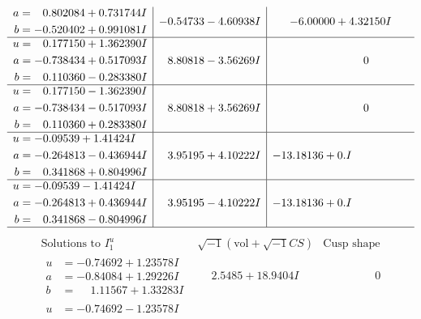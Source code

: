 \documentclass[1p]{elsarticle_modified}
\theoremstyle{definition}
\newcommand{\I}{\sqrt{-1}}
\begin{document}
$$\begin{array}{c|c|c}
\begin{aligned}
a &= \phantom{-}0.802084 + 0.731744 I \\
b &= -0.520402 + 0.991081 I\end{aligned}
 & -0.54733 - 4.60938 I & -6.00000 + 4.32150 I \\ \hline\begin{aligned}
u &= \phantom{-}0.177150 + 1.362390 I \\
a &= -0.738434 + 0.517093 I \\
b &= \phantom{-}0.110360 - 0.283380 I\end{aligned}
 & \phantom{-}8.80818 - 3.56269 I & \phantom{-0.000000 } 0 \\ \hline\begin{aligned}
u &= \phantom{-}0.177150 - 1.362390 I \\
a &= -0.738434 - 0.517093 I \\
b &= \phantom{-}0.110360 + 0.283380 I\end{aligned}
 & \phantom{-}8.80818 + 3.56269 I & \phantom{-0.000000 } 0 \\ \hline\begin{aligned}
u &= -0.09539 + 1.41424 I \\
a &= -0.264813 - 0.436944 I \\
b &= \phantom{-}0.341868 + 0.804996 I\end{aligned}
 & \phantom{-}3.95195 + 4.10222 I & -13.18136 + 0. I\phantom{ +0.000000I} \\ \hline\begin{aligned}
u &= -0.09539 - 1.41424 I \\
a &= -0.264813 + 0.436944 I \\
b &= \phantom{-}0.341868 - 0.804996 I\end{aligned}
 & \phantom{-}3.95195 - 4.10222 I & -13.18136 + 0. I\phantom{ +0.000000I}\\
 \hline 
 \end{array}$$\newpage$$\begin{array}{c|c|c}  
\text{Solutions to }I^u_{1}& \I (\text{vol} + \sqrt{-1}CS) & \text{Cusp shape}\\
 \hline 
\begin{aligned}
u &= -0.74692 + 1.23578 I \\
a &= -0.84084 + 1.29226 I \\
b &= \phantom{-}1.11567 + 1.33283 I\end{aligned}
 & \phantom{-}2.5485 + 18.9404 I & \phantom{-0.000000 } 0 \\ \hline\begin{aligned}
u &= -0.74692 - 1.23578 I \\

\end{aligned}
\end{array}$$
\end{document}
